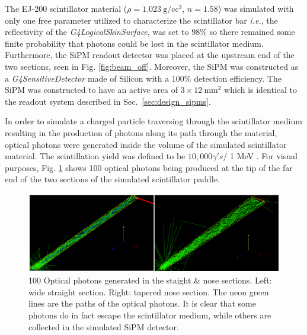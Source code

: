 The EJ-200 scintillator material ($\rho=1.023~\mathrm{g/cc^{3}}$, $n = 1.58$) \cite{ej200_specs} was simulated with only one free parameter utilized to characterize the scintillator bar \textit{i.e.}, the reflectivity of the \textit{G4LogicalSkinSurface}, was set to 98\% so there remained some finite probability that photons could be lost in the scintillator medium.  Furthermore, the SiPM readout detector was placed at the upstream end of the two sections, seen in Fig. \ref{fig:beam_off}.  Moreover, the SiPM was constructed as a \textit{G4SensitiveDetector} made of Silicon with a 100\% detection efficiency.  The SiPM was constructed to have an active area of $\mathrm{3 \times 12~mm^2}$ which is identical to the readout system described in Sec.~\ref{sec:design_sipms}.

In order to simulate a charged particle traversing through the scintillator medium resulting in the production of photons along its path through the material, optical photons were generated inside the volume of the simulated scintillator material.  The scintillation yield was defined to be $10,000 \gamma 's / $ 1 MeV \cite{ej200_specs}. For visual purposes, Fig. \ref{fig:100_events} shows 100 optical photons being produced at the tip of the far end of the two sections of the simulated scintillator paddle.
	\begin{figure}[!htb]
	\centering
	\includegraphics[width=1.0\columnwidth]{simulation/figs/100_events}
	\caption{100 Optical photons generated in the staight \& nose sections.  Left: wide straight section.  Right: tapered nose section.  The neon green lines are the paths of the optical photons.  It is clear that some photons do in fact escape the scintillator medium, while others are collected in the simulated SiPM detector.}
	\label{fig:100_events}
	\end{figure}

